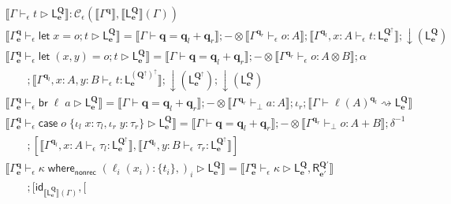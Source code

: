 \documentclass[acmsmall,screen,review]{acmart}
\newcommand{\mc}[1]{\ensuremath{\mathcal{#1}}}
\newcommand{\mb}[1]{\ensuremath{\mathbf{#1}}}
\newcommand{\ms}[1]{\ensuremath{\mathsf{#1}}}
\newcommand{\lto}{:}
\newcommand{\linl}[1]{\iota_l\;{#1}}
\newcommand{\linr}[1]{\iota_r\;{#1}}
\newcommand{\letstmt}[3]{\ensuremath{\ms{let}\;#1 = #2; #3}}
\newcommand{\brb}[2]{\ms{br}\;#1\;#2}
\newcommand{\casestmt}[5]{\ms{case}\;#1\;\{\linl{#2} \lto #3, \linr{#4} \lto #5\}}
\newcommand{\awhere}[2]{#1\;\ms{where}_{\ms{nonrec}}\;#2}
\newcommand{\wbranch}[3]{#1(#2) \lto \{#3\}}
\newcommand{\qsp}[4]{#1 \vdash #2 = #3 + #4}
\newcommand{\lwk}[3]{#1 \vdash #2 \rightsquigarrow #3}
\newcommand{\lhyp}[2]{#1(#2)}
\newcommand{\hasty}[4]{#1 \vdash_{#2} #3: {#4}}
\newcommand{\haslb}[4]{#1 \vdash_{#2} #3 \rhd #4}
\newcommand{\dnt}[1]{\llbracket{#1}\rrbracket}
\newcommand{\zeroqv}[1]{#1^\uparrow}
\newcommand{\dwnqv}[1]{\downarrow(#1)}
\begin{document}
\begin{figure}
  \begin{gather*}
    \boxed{\dnt{\haslb{\Gamma}{\epsilon}{t}{\ms{L}^{\mb{Q}}_{\mb{e}}}}
    : \mc{C}_\epsilon(\dnt{\Gamma^{\mb{q}}}, \dnt{\ms{L}^{\mb{Q}}_{\mb{e}}}(\Gamma))} \\
    \dnt
    {\haslb{\Gamma^{\mb{q}}_{\mb{e}}}{\epsilon}{\letstmt{x}{o}{t}}{\ms{L}^{\mb{Q}}_{\mb{e}}}}
    =
    \dnt{\qsp{\Gamma}{\mb{q}}{\mb{q}_l}{\mb{q}_r}}
    ; - \otimes \dnt{\hasty{\Gamma^{\mb{q}_r}}{\epsilon}{o}{A}}
    ; \dnt{\hasty{\Gamma^{\mb{q}_l}, x : A}{\epsilon}{t}{\ms{L}^{\zeroqv{\mb{Q}}}_{\mb{e}}}}
    ; \dwnqv{\ms{L}^{\mb{Q}}_{\mb{e}}} \\
    \dnt
    {\haslb{\Gamma^{\mb{q}}_{\mb{e}}}{\epsilon}{\letstmt{(x, y)}{o}{t}}{\ms{L}^{\mb{Q}}_{\mb{e}}}}
    =
    \dnt{\qsp{\Gamma}{\mb{q}}{\mb{q}_l}{\mb{q}_r}}
    ; - \otimes \dnt{\hasty{\Gamma^{\mb{q}_r}}{\epsilon}{o}{A \otimes B}}
    ; \alpha
    \\
    \qquad 
    ; \dnt{\hasty{\Gamma^{\mb{q}_l}, x : A, y : B}{\epsilon}{t}
      {\ms{L}^{\zeroqv{(\zeroqv{\mb{Q}})}}_{\mb{e}}}}
    ; \dwnqv{\ms{L}^{\zeroqv{\mb{Q}}}_{\mb{e}}}
    ; \dwnqv{\ms{L}^{\mb{Q}}_{\mb{e}}}
    \\
    \dnt
    {\haslb{\Gamma^{\mb{q}}_{\mb{e}}}{\epsilon}{\brb{\ell}{a}}{\ms{L}^{\mb{Q}}_{\mb{e}}}}
    = \dnt{\qsp{\Gamma}{\mb{q}}{\mb{q}_l}{\mb{q}_r}}
    ; - \otimes \dnt{\hasty{\Gamma^{\mb{q}_r}}{\bot}{a}{A}}
    ; \iota_r
    ; \dnt{\lwk{\Gamma}{\lhyp{\ell}{A}^{\mb{q}_l}}{\ms{L}^{\mb{Q}}_{\mb{e}}}}
    \\
    \dnt
    {\haslb{\Gamma^{\mb{q}}_{\mb{e}}}{\epsilon}{\casestmt{o}{x}{\tau_l}{y}{\tau_r}}
      {\ms{L}^{\mb{Q}}_{\mb{e}}}}
    = \dnt{\qsp{\Gamma}{\mb{q}}{\mb{q}_l}{\mb{q}_r}}
    ; - \otimes \dnt{\hasty{\Gamma^{\mb{q}_r}}{\bot}{o}{A + B}}
    ; \delta^{-1}
    \\
    \qquad
    ; [
      \dnt{\hasty{\Gamma^{\mb{q}_l}, x : A}{\epsilon}{\tau_l}{\ms{L}^{\zeroqv{\mb{Q}}}_{\mb{e}}}},
      \dnt{\hasty{\Gamma^{\mb{q}_l}, y : B}{\epsilon}{\tau_r}{\ms{L}^{\zeroqv{\mb{Q}}}_{\mb{e}}}}
    ]
    \\
    \dnt
    {\haslb{\Gamma^{\mb{q}}_{\mb{e}}}{\epsilon}{\awhere{\kappa}{(\wbranch{\ell_i}{x_i}{t_i},)_i}}
      {\ms{L}^{\mb{Q}}_{\mb{e}}}}
    =
    \dnt{\haslb{\Gamma^{\mb{q}}_{\mb{e}}}{\epsilon}{\kappa}
      {\ms{L}^{\mb{Q}}_{\mb{e}}, \ms{R}^{\mb{Q}'}_{\mb{e}'}}}
    \\ 
    \qquad ; [
      \ms{id}_{\dnt{\ms{L}^{\mb{Q}}_{\mb{e}}}(\Gamma)},
      [

\end{gather*}
\end{figure}
\end{document}
